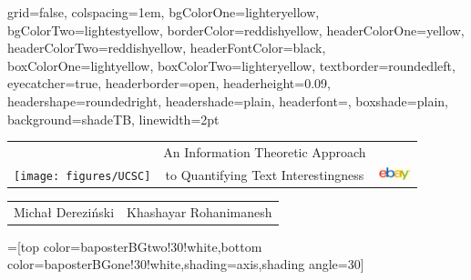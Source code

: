 \documentclass[portrait,a0paper]{baposter-templ/baposter}
\let\polishl\l
\begin{document}
\newlength{\leftimgwidth}
\begin{poster}%
  {
  grid=false,
  colspacing=1em,
  bgColorOne=lighteryellow,
  bgColorTwo=lightestyellow,
  borderColor=reddishyellow,
  headerColorOne=yellow,
  headerColorTwo=reddishyellow,
  headerFontColor=black,
  boxColorOne=lightyellow,
  boxColorTwo=lighteryellow,
  textborder=roundedleft,
  eyecatcher=true,
  headerborder=open,
  headerheight=0.09\textheight,
  headershape=roundedright,
  headershade=plain,
  headerfont=\Large\textsf, %
  boxshade=plain,
  background=shadeTB,
  linewidth=2pt
  }
  {} %
  {\sf 
\begin{tabular}{c@{\qquad}c@{\qquad}c}
& An Information Theoretic Approach & \\
\texttt{[image: figures/UCSC]} 
& to Quantifying Text Interestingness &
\includegraphics[height=1em]{figures/ebay-logo-640.jpg} 
\end{tabular}
 \vspace{.3em}}
{\sf %
\begin{tabular}{c@{\qquad\qquad}c}%
Micha{\polishl} Derezi\'{n}ski &
Khashayar Rohanimanesh
\\
\end{tabular}
%
%
\vspace{-.5em} %
}
{}
=[top color=baposterBGtwo!30!white,bottom color=baposterBGone!30!white,shading=axis,shading angle=30]




\end{poster}
\end{document}
